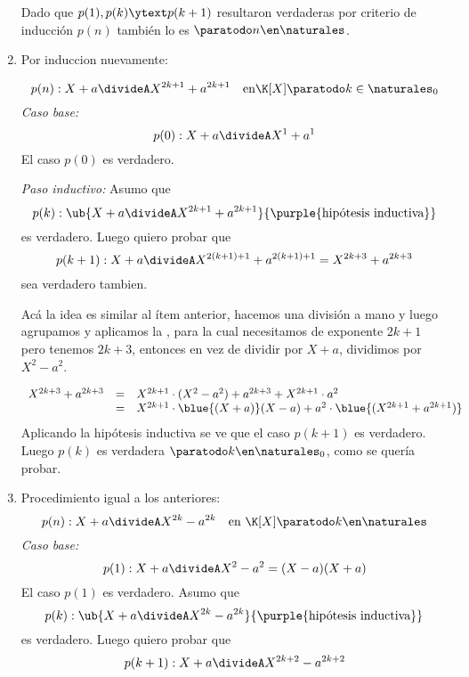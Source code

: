 \begin{enumerate}[label=\roman*)]
        \medskip

        Dado que $p(1), p(k) \ytext p(k+1)$ resultaron verdaderas por criterio de inducción $p(n)$ también lo es $\paratodo n \en \naturales$.

  \item Por induccion nuevamente:

        $$
          p(n): X + a \divideA X^{2k + 1} + a^{2k + 1} \quad \text{en} \K[X] \paratodo k \in \naturales_0
        $$
        \textit{Caso base:}
        $$
          p(0) : X + a \divideA X^1 + a^1
        $$
        El caso $p(0)$ es verdadero.

        \textit{Paso inductivo: }
        Asumo que
        $$
          p(k) : \ub{
            X + a \divideA X^{2k + 1} + a^{2k + 1}
          }{
            \text{\purple{hipótesis inductiva}}
          }
        $$
        es verdadero. Luego quiero probar que
        $$
          p(k + 1) : X + a \divideA X^{2(k+1) + 1} + a^{2(k+1) + 1} = X^{2k + 3} + a^{2k + 3}
        $$
        sea verdadero tambien.

        Acá la idea es similar al ítem anterior, hacemos una división a mano y luego agrupamos y aplicamos la
        , para la cual necesitamos de exponente $2k + 1$ pero tenemos
        $2k + 3$, entonces en vez de dividir por $X + a$, dividimos por $X^2 - a^2$.

        $$
          \begin{array}{rcl}
            X^{2k + 3} + a^{2k + 3} & = & X^{2k + 1}\cdot(X^2 - a^2) + a^{2k+3} + X^{2k + 1}\cdot a^2                       \\
                                    & = & X^{2k + 1}\cdot\blue{(X + a)}(X - a) + a^2 \cdot \blue{(X^{2k + 1} + a^{2k + 1})}
          \end{array}
        $$
        Aplicando la hipótesis inductiva se ve que el caso $p(k+1)$ es verdadero. Luego
        $p(k)$ es verdadera $\paratodo k \en \naturales_0$, como se quería probar.

  \item Procedimiento igual a los anteriores:
        $$
          p(n) : X + a \divideA X^{2k} - a^{2k} \quad \text{en } \K[X] \paratodo k \en \naturales
        $$
        \textit{Caso base:}
        $$
          p(1) : X + a \divideA X^2 - a^2 = (X - a)(X + a)
        $$
        El caso $p(1)$ es verdadero.
        Asumo que
        $$
          p(k) :
          \ub{
            X + a \divideA X^{2k} - a^{2k}
          }{
            \text{\purple{hipótesis inductiva}}
          }
        $$
        es verdadero. Luego quiero probar que
        $$
          p(k + 1) : X + a \divideA X^{2k + 2} - a^{2k + 2}
        $$


\end{enumerate}
